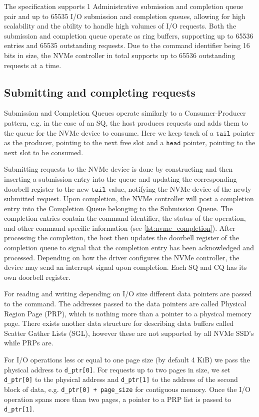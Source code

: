 The specification supports 1 Administrative submission and completion queue pair and up to 65535 I/O submission and completion queues, allowing for high scalability and the ability to handle high volumes of I/O requests. Both the submission and completion queue operate as ring buffers, supporting up to 65536 entries and 65535 outstanding requests. Due to the command identifier being 16 bits in size, the NVMe controller in total supports up to 65536 outstanding requests at a time.

\subsection{Submitting and completing requests}
Submission and Completion Queues operate similarly to a Consumer-Producer pattern, e.g. in the case of an SQ, the host produces requests and adds them to the queue for the NVMe device to consume. Here we keep track of a $\texttt{tail}$ pointer as the producer, pointing to the next free slot and a $\texttt{head}$ pointer, pointing to the next slot to be consumed.

Submitting requests to the NVMe device is done by constructing and then inserting a submission entry into the queue and updating the corresponding doorbell register to the new $\texttt{tail}$ value, notifying the NVMe device of the newly submitted request. Upon completion, the NVMe controller will post a completion entry into the Completion Queue belonging to the Submission Queue. The completion entries contain the command identifier, the status of the operation, and other command specific information (see \ref{lst:nvme_completion}). After processing the completion, the host then updates the doorbell register of the completion queue to signal that the completion entry has been acknowledged and processed. Depending on how the driver configures the NVMe controller, the device may send an interrupt signal upon completion. Each SQ and CQ has its own doorbell register.

For reading and writing depending on I/O size different data pointers are passed to the command. The addresses passed to the data pointers are called Physical Region Page (PRP), which is nothing more than a pointer to a physical memory page. There exists another data structure for describing data buffers called Scatter Gather Lists (SGL), however these are not supported by all NVMe SSD's while PRPs are.

For I/O operations less or equal to one page size (by default 4 KiB) we pass the physical address to \texttt{d\_ptr[0]}. For requests up to two pages in size, we set \texttt{d\_ptr[0]} to the physical address and \texttt{d\_ptr[1]} to the address of the second block of data, e.g. \texttt{d\_ptr[0] + page\_size} for contiguous memory. Once the I/O operation spans more than two pages, a pointer to a PRP list is passed to \texttt{d\_ptr[1]}.

